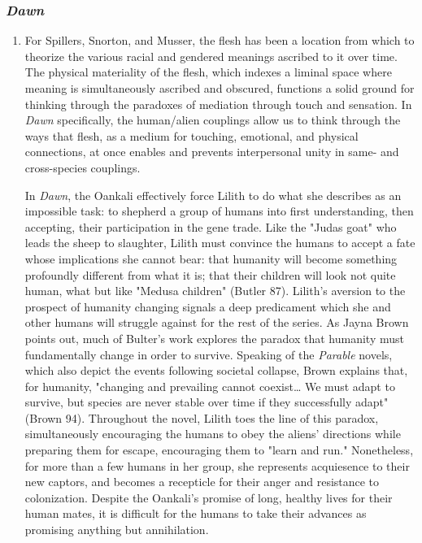 \documentclass[11pt]{article}
\begin{document}
\subsubsection{\emph{Dawn}}
\label{sec:orga6599e6}
\begin{enumerate}
\item For Spillers, Snorton, and Musser, the flesh has been a location from
\label{sec:org270b247}
which to theorize the various racial and gendered meanings ascribed to
it over time. The physical materiality of the flesh, which indexes a
liminal space where meaning is simultaneously ascribed and obscured,
functions a solid ground for thinking through the paradoxes of
mediation through touch and sensation. In \emph{Dawn} specifically, the
human/alien couplings allow us to think through the ways that flesh,
as a medium for touching, emotional, and physical connections, at once
enables and prevents interpersonal unity in same- and cross-species
couplings.

In \emph{Dawn}, the Oankali effectively force Lilith to do what she
describes as an impossible task: to shepherd a group of humans into
first understanding, then accepting, their participation in the gene
trade. Like the "Judas goat" who leads the sheep to slaughter, Lilith
must convince the humans to accept a fate whose implications she
cannot bear: that humanity will become something profoundly different
from what it is; that their children will look not quite human, what
but like "Medusa children" (Butler 87). Lilith's aversion to the
prospect of humanity changing signals a deep predicament which she and
other humans will struggle against for the rest of the series. As
Jayna Brown points out, much of Bulter's work explores the paradox
that humanity must fundamentally change in order to survive. Speaking
of the \emph{Parable} novels, which also depict the events following
societal collapse, Brown explains that, for humanity, "changing and
prevailing cannot coexist\ldots{} We must adapt to survive, but species are
never stable over time if they successfully adapt" (Brown
94). Throughout the novel, Lilith toes the line of this paradox,
simultaneously encouraging the humans to obey the aliens' directions
while preparing them for escape, encouraging them to "learn and run."
Nonetheless, for more than a few humans in her group, she represents
acquiesence to their new captors, and becomes a recepticle for their
anger and resistance to colonization. Despite the Oankali's promise of
long, healthy lives for their human mates, it is difficult for the
humans to take their advances as promising anything but annihilation.


\end{enumerate}
\end{document}
